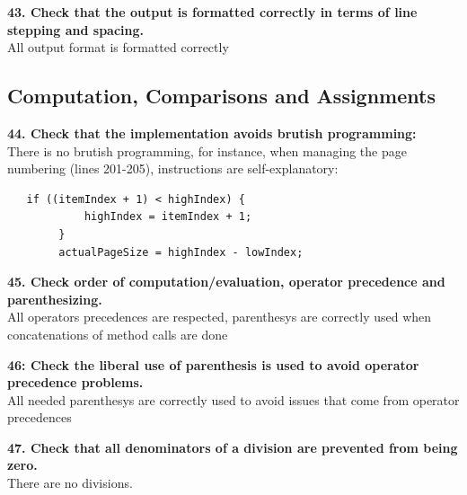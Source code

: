 \documentclass{article}
\begin{document}
\begin{flushleft}
\textbf{43. Check that the output is formatted correctly in terms of line stepping and spacing.}\\
\vspace{0.5cm}
All output format is formatted correctly\\
\vspace{0.5cm}






\subsection{Computation, Comparisons and Assignments}
\textbf{44. Check that the implementation avoids brutish programming:}\\
\vspace{0.5cm}
There is no brutish programming, for instance, when managing the page numbering (lines 201-205), instructions are self-explanatory: \\
\vspace{0.5cm}
\begin{lstlisting}
   if ((itemIndex + 1) < highIndex) {
            highIndex = itemIndex + 1;
        }
        actualPageSize = highIndex - lowIndex;
   \end{lstlisting}     
     \vspace{0.5cm}   
        
\textbf{45. Check order of computation/evaluation, operator precedence and parenthesizing.}  \\
\vspace{0.5cm}
All operators precedences are respected, parenthesys are correctly used when concatenations of method calls are done \\
\vspace{0.5cm}
   
   
   
\textbf{46: Check the liberal use of parenthesis is used to avoid operator precedence problems.}    \\
\vspace{0.5cm}
All needed parenthesys are correctly used to avoid issues that come from operator precedences\\
\vspace{0.5cm}


\textbf{47. Check that all denominators of a division are prevented from being zero.} \\
\vspace{0.5cm}
There are no divisions.\\
\vspace{0.5cm}



\end{flushleft}
\end{document}
